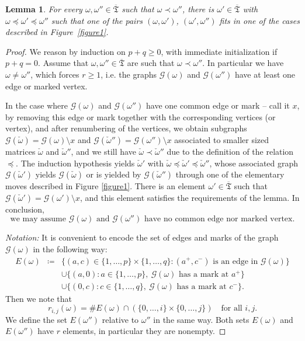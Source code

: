 \documentclass[11pt]{article}
\newtheorem{lemma}[theo]{Lemma}
\theoremstyle{definition}
\numberwithin{equation}{section}
\newcommand{\card}[1]{\# #1}
\newcommand{\ppermutationsof}{\mathfrak{T}}
\newcommand{\parameters}{\overline{\ppermutationsof}}
\begin{document}
\begin{lemma}
\label{L3.6}
For every $\omega,\omega''\in\parameters$ such that $\omega\prec\omega''$, there is $\omega'\in\parameters$ with $\omega\preceq\omega'\preceq\omega''$ such that one of the pairs $(\omega,\omega')$, $(\omega',\omega'')$ fits in one of the cases described in Figure~\ref{figure1}.
\end{lemma}

\begin{proof}
We reason by induction on $p+q\geq 0$, with immediate initialization if $p+q=0$.
Assume that $\omega,\omega''\in\parameters$ are such that $\omega\prec\omega''$. In particular we have $\omega\not=\omega''$,
which forces $r\geq 1$,
i.e.  the graphs $\mathcal{G}(\omega)$ and $\mathcal{G}(\omega'')$ have at least one edge or marked vertex.

In the case where $\mathcal{G}(\omega)$ and $\mathcal{G}(\omega'')$ have
one common edge or mark -- call it $x$,
by removing this edge or mark together with the corresponding vertices (or vertex), and after renumbering of the vertices, we obtain subgraphs $\mathcal{G}(\check\omega)=\mathcal{G}(\omega)\setminus x$ and $\mathcal{G}(\check\omega'')=\mathcal{G}(\omega'')\setminus x$ associated to smaller sized matrices $\check\omega$ and $\check\omega''$, and we still have $\check\omega\prec\check\omega''$ due to the definition of the relation $\preceq$. The induction hypothesis yields $\check\omega'$ with $\check\omega\preceq\check\omega'\preceq\check\omega''$, whose associated graph $\mathcal{G}(\check\omega')$ yields $\mathcal{G}(\check\omega)$ or is yielded by $\mathcal{G}(\check\omega'')$ through one of the elementary moves described in Figure \ref{figure1}. There is an element $\omega'\in\parameters$ such that $\mathcal{G}(\check\omega')=\mathcal{G}(\omega')\setminus x$, and this element satisfies the requirements of the lemma. In conclusion,
\begin{equation}
\label{no-common-edge}
\mbox{we may assume $\mathcal{G}(\omega)$ and $\mathcal{G}(\omega'')$ have no common edge nor marked vertex.}
\end{equation}

\noindent
{\it Notation:}
It is convenient to encode the set of edges and marks of the graph $\mathcal{G}(\omega)$ in the following way:
\begin{eqnarray*}
E(\omega) & \coloneqq  & \{(a,c)\in\{1,\ldots,p\}\times\{1,\ldots,q\}:\mbox{$(a^+,c^-)$ is an edge in $\mathcal{G}(\omega)$}\}\\
 & & \cup\{(a,0):a\in\{1,\ldots,p\},\ \mbox{$\mathcal{G}(\omega)$ has a mark at $a^+$}\}\\
 & & \cup\{(0,c):c\in\{1,\ldots,q\},\ \mbox{$\mathcal{G}(\omega)$ has a mark at $c^-$}\}.
\end{eqnarray*}
Then we note that
\begin{equation}
\label{E-and-rij}
r_{i,j}(\omega)=\card E(\omega)\cap(\{0,\ldots,i\}\times\{0,\ldots,j\})\quad\mbox{for all $i,j$}.
\end{equation}
We define the set $E(\omega'')$ relative to $\omega''$ in the same way.
Both sets $E(\omega)$ and $E(\omega'')$ have $r$ elements, in particular they are nonempty.



\end{proof}
\end{document}
